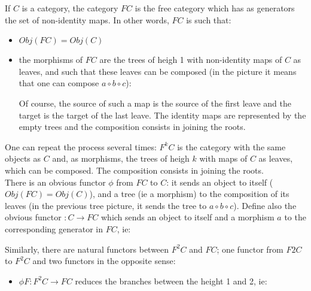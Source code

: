 \begin{refsection}
\begin{defin}
If $C$ is a category, the category $FC$ is the free category which has as generators the set of non-identity maps. In other words, $FC$ is such that:
\begin{itemize}
\item $Obj(FC)=Obj(C)$
\item the morphisms of $FC$ are the trees of heigh 1 with non-identity maps of $C$ as leaves, and such that these leaves can be composed (in the picture it means that one can compose $a \circ b \circ c$):\\
\begin{center}
\end{center}
Of course, the source of such a map is the source of the first leave and the target is the target of the last leave. The identity maps are represented by the empty trees and the composition consists in joining the roots.
\end{itemize}
\end{defin}

One can repeat the process several times: $F^kC$ is the category with the same objects as $C$ and, as morphisms, the trees of heigh $k$ with maps of $C$ as leaves, which can be composed. The composition consists in joining the roots.\\

There is an obvious functor $\phi$ from $FC$ to $C$: it sends an object to itself ($Obj(FC)=Obj(C)$), and a tree (ie a morphism) to the composition of its leaves (in the previous tree picture, it sends the tree to $a \circ b \circ c$). Define also the obvious functor $:C \rightarrow FC$ which sends an object to itself and a morphism $a$ to the corresponding generator in $FC$, ie:
\begin{center}
\end{center}  


Similarly, there are natural functors between $F^2C$ and $FC$; one functor from $F2C$ to $F^2C$ and two functors in the opposite sense:
\begin{itemize}
\item $\phi F: F^2C \rightarrow FC$ reduces the branches between the height 1 and 2, ie:
\begin{center}
\end{center}
\end{itemize}
\end{refsection}
